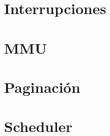 \documentclass[a4paper]{article}
\begin{document}
\clearpage

\section{Interrupciones} 


\clearpage

\section{MMU}


\clearpage

\section{Paginación}


\clearpage

\section{Scheduler}

\end{document}
